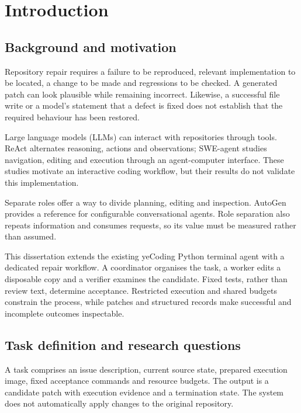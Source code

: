 \chapter{Introduction}\label{chap:1}

\section{Background and motivation}\label{sec:1.1}

Repository repair requires a failure to be reproduced, relevant implementation to be located, a change to be made and regressions to be checked. A generated patch can look plausible while remaining incorrect. Likewise, a successful file write or a model's statement that a defect is fixed does not establish that the required behaviour has been restored.

Large language models (LLMs) can interact with repositories through tools. ReAct alternates reasoning, actions and observations; SWE-agent studies navigation, editing and execution through an agent-computer interface. These studies motivate an interactive coding workflow, but their results do not validate this implementation. \citep{yao2023react, yang2024sweagent}

Separate roles offer a way to divide planning, editing and inspection. AutoGen provides a reference for configurable conversational agents. Role separation also repeats information and consumes requests, so its value must be measured rather than assumed. \citep{wu2024autogen}

This dissertation extends the existing yeCoding Python terminal agent with a dedicated repair workflow. A coordinator organises the task, a worker edits a disposable copy and a verifier examines the candidate. Fixed tests, rather than review text, determine acceptance. Restricted execution and shared budgets constrain the process, while patches and structured records make successful and incomplete outcomes inspectable.

\section{Task definition and research questions}\label{sec:1.2}

A task comprises an issue description, current source state, prepared execution image, fixed acceptance commands and resource budgets. The output is a candidate patch with execution evidence and a termination state. The system does not automatically apply changes to the original repository.


